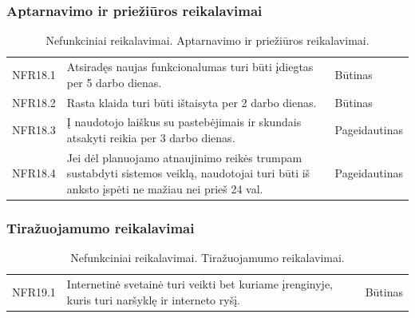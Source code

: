 \documentclass{VUMIFPSkursinis}
\begin{document}
\subsubsection{Aptarnavimo ir priežiūros reikalavimai}
\begin{table}[H]
\caption{Nefunkciniai reikalavimai. Aptarnavimo ir priežiūros reikalavimai.}
\centering
\normalsize
\begin{tabular}{|p{2cm}|p{10cm}|p{3cm}|}
\hline
\rowcolor{gray!30}
\multicolumn{3}{|l|}{\textbf{Aptarnavimo ir priežiūros reikalavimai}} \\ \hline
NFR18.1 & \multicolumn{1}{m{10cm}|}{Atsiradęs naujas funkcionalumas turi būti įdiegtas per 5 darbo dienas.} & Būtinas \\ \hline
NFR18.2 & \multicolumn{1}{m{10cm}|}{Rasta klaida turi būti ištaisyta per 2 darbo dienas.} & Būtinas \\ \hline
NFR18.3 & \multicolumn{1}{m{10cm}|}{Į naudotojo laiškus su pastebėjimais ir skundais atsakyti reikia per 3 darbo dienas.} & Pageidautinas \\ \hline
NFR18.4 & \multicolumn{1}{m{10cm}|}{Jei dėl planuojamo atnaujinimo reikės trumpam sustabdyti sistemos veiklą, naudotojai turi būti iš anksto įspėti ne mažiau nei prieš 24 val.} & Pageidautinas \\ \hline
\end{tabular}
\end{table}


\subsubsection{Tiražuojamumo reikalavimai}
\begin{table}[H]
\caption{Nefunkciniai reikalavimai. Tiražuojamumo reikalavimai.}
\centering
\normalsize
\begin{tabular}{|p{2cm}|p{10cm}|p{3cm}|}
\hline
\rowcolor{gray!30}
\multicolumn{3}{|l|}{\textbf{Tiražuojamumo reikalavimai}} \\ \hline
NFR19.1 & \multicolumn{1}{m{10cm}|}{Internetinė svetainė turi veikti bet kuriame įrenginyje, kuris turi naršyklę ir interneto ryšį.} & Būtinas \\ \hline
\end{tabular}
\end{table}
\end{document}
